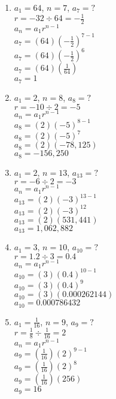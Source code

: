 \begin{enumerate}[label = \Alph*. ]
\begin{multicols}{2}
\begin{enumerate}[label = \arabic*. ]
	\item %
	$a_1=64$, $n=7$, $a_{7}=? $\\
	$r=-32\div 64=-\displaystyle \frac{1}{2} $\\
	$a_n=a_1r^{n-1}$\\	  
	$a_7=(64)\left(-\displaystyle \frac{1}{2}\right)^{7-1}$\\
	$a_7=(64)\left(-\displaystyle \frac{1}{2}\right)^{6} $\\
	$a_7=(64)\left(\displaystyle \frac{1}{64}\right) $\\
	$a_7=1$
	
	\item %
		$a_1=2$, $n=8$, $a_{8}=? $\\
	$r=-10\div 2=-5$\\
	$a_n=a_1r^{n-1}$\\	  
	$a_8=(2)(-5)^{8-1}$\\
	$a_8=(2)(-5)^{7}$\\
	$a_8=(2)(-78,125)$\\
	$a_8=-156,250$
	
	\item %
		$a_1=2$, $n=13$, $a_{13}=? $\\
	$r=-6\div 2=-3$\\
	$a_n=a_1r^{n-1}$\\	  
	$a_{13}=(2)(-3)^{13-1}$\\
	$a_{13}=(2)(-3)^{12} $\\
	$a_{13}=(2)(531,441) $\\
	$a_{13}=1,062,882$
	
	\item %
		$a_1=3$, $n=10$, $a_{10}=? $\\
	$r=1.2\div 3=0.4$\\
	$a_n=a_1r^{n-1}$\\	  
	$a_{10}=(3)(0.4)^{10-1}$\\
	$a_{10}=(3)(0.4)^{9} $\\
	$a_{10}=(3)(0.000262144) $\\
	$a_{10}=0.000786432$
	
	\item %
		$a_1=\displaystyle  \frac{1}{16}$, $n=9$, $a_{9}=? $\\
	$r=\displaystyle\frac{1}{8}\div \frac{1}{16}=2$\\
	$a_n=a_1r^{n-1}$\\	  
	$a_9=\left(\displaystyle  \frac{1}{16}\right) (2)^{9-1}$\\
	$a_9=\left(\displaystyle  \frac{1}{16}\right) (2)^{8} $\\
	$a_9=\left(\displaystyle  \frac{1}{16}\right) (256) $\\
	$a_9=16$
	\end{enumerate}



\end{multicols}
\end{enumerate}
